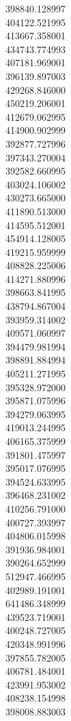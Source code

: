 398840.128997\\
404122.521995\\
413667.358001\\
434743.774993\\
407181.969001\\
396139.897003\\
429268.846000\\
450219.206001\\
412679.062995\\
414900.902999\\
392877.727996\\
397343.270004\\
392582.660995\\
403024.106002\\
430273.665000\\
411890.513000\\
414595.512001\\
454914.128005\\
419215.959999\\
408828.225006\\
414271.880996\\
398663.841995\\
438794.867004\\
393959.314002\\
409571.060997\\
394479.981994\\
398891.884994\\
405211.271995\\
395328.972000\\
395871.075996\\
394279.063995\\
419013.244995\\
406165.375999\\
391801.475997\\
395017.076995\\
394524.633995\\
396468.231002\\
410256.791000\\
400727.393997\\
404806.015998\\
391936.984001\\
390264.652999\\
512947.466995\\
402989.191001\\
641486.348999\\
439523.719001\\
400248.727005\\
420348.991996\\
397855.782005\\
406781.484001\\
423991.953002\\
408238.154998\\
398008.883003\\
